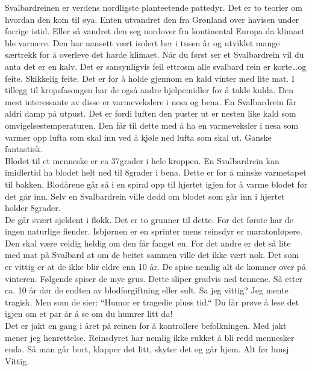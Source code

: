 Svalbardreinen er verdens nordligste planteetende pattedyr. Det er to teorier om hvordan
den kom til øya. Enten utvandret den fra Grønland over havisen under
forrige istid. Eller så vandret den seg nordover fra kontinental
Europa da klimaet ble varmere. Den har uansett vært isolert her i
tusen år og utviklet mange særtrekk for å overleve det harde klimaet.
Når du først ser et Svalbardrein vil du anta det er en kalv. Det
er sansynligvis feil ettrosm alle svalbard rein er korte\ldots og feite.
Skikkelig feite. Det er for å holde gjennom en kald vinter med lite
mat. I tillegg til kropsfasongen har de også andre hjelpemidler for å
takle kulda. Den mest interessante av disse er varmevekslere i nesa og
bena. En Svalbardrein får aldri damp på utpust. Det er fordi
luften den puster ut er nesten like kald som omvigelsestemperaturen.
Den får til dette med å ha en varmeveksler i nesa som varmer opp lufta
som skal inn ved å kjøle ned lufta som skal ut. Ganske fantastisk.\\

Blodet til et menneske
er ca 37grader i hele kroppen. En Svalbardrein kan imidlertid ha
blodet helt ned til 8grader i bena. Dette er for å minske varmetapet
til bakken. Blodårene går så i en spiral opp til hjertet igjen for å
varme blodet før det går inn. Selv en Svalbardrein ville dødd om blodet
som går inn i hjertet holder 8grader. \\

De går svært sjeldent i flokk. Det er to grunner til dette. For det
første har de ingen naturlige fiender. Isbjørnen er en sprinter mens
reinsdyr er maratonløpere. Den skal være veldig heldig om den får
fanget en. For det andre er det så lite med mat på Svalbard at om de
beitet sammen ville det ikke vært nok. Det som er vittig er at de ikke
blir eldre enn 10 år. De spise nemlig alt de kommer over på vinteren.
Følgende spiser de mye grus. Dette sliper gradvis ned tennene. Så
etter ca. 10 år dør de endten av blodforgiftning eller sult. Sa jeg
vittig? Jeg mente tragisk. Men som de sier: ``Humor er tragedie pluss
tid.`` Du får prøve å lese det igjen om et par år å se om du humrer
litt da!\\

Det er jakt en gang i året på reinen for å kontrollere befolkningen.
Med jakt mener jeg henrettelse. Reinsdyret har nemlig ikke rukket å
bli redd mennesker enda. Så man går bort, klapper det litt, skyter det
og går hjem. Alt før lunsj. Vittig.





